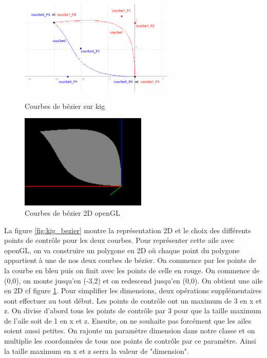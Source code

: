 \documentclass{article}
\begin{document}
\begin{figure}[!htb]
	\begin{minipage}{0.5\textwidth}
    	\centering
    	\includegraphics[height=4.5cm]{./assets/kig_bezier.png}
    	\caption{Courbes de bézier sur kig}
    	\label{fig:kig_bezier}
	\end{minipage}
	\hfill
	\begin{minipage}{0.5\textwidth}
    	\centering
    	\includegraphics[height=4.5cm]{./assets/2D_bezier.png}
    	\caption{Courbes de bézier 2D openGL}
    	\label{fig:2D_bezier}
	\end{minipage}
\end{figure}
\newpage

La figure \ref{fig:kig_bezier} montre la représentation 2D et le choix des différents points de contrôle pour les deux courbes. Pour représenter cette aile avec openGL, on va construire un polygone en 2D où chaque point du polygone appartient à une de nos deux courbes de bézier. On commence par les points de la courbe en bleu puis on finit avec les points de celle en rouge. On commence de (0,0), on monte jusqu'en (-3,2) et on redescend jusqu'en (0,0). On obtient une aile en 2D cf figure \ref{fig:2D_bezier}. 
\newline
\newline
Pour simplifier les dimensions, deux opérations supplémentaires sont effectuer au tout début. Les points de contrôle ont un maximum de 3 en x et z. On divise d'abord tous les points de contrôle par 3 pour que la taille maximum de l'aile soit de 1 en x et z. Ensuite, on ne souhaite pas forcément que les ailes soient aussi petites. On rajoute un paramètre dimension dans notre classe et on multiplie les coordonnées de tous nos points de contrôle par ce paramètre. Ainsi la taille maximum en x et z serra la valeur de "dimension".
\end{document}

